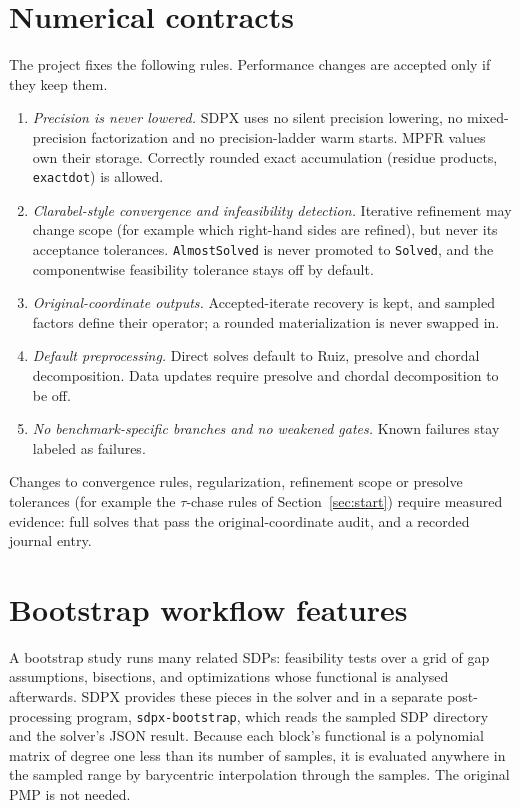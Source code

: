 \documentclass[11pt]{article}
\newcommand{\code}[1]{\texttt{#1}}
\begin{document}
\section{Numerical contracts}
\label{sec:contracts}

The project fixes the following rules. Performance changes are accepted only
if they keep them.
\begin{enumerate}
  \item \emph{Precision is never lowered.} SDPX uses no silent precision
    lowering, no mixed-precision factorization and no precision-ladder warm
    starts. MPFR values own their storage. Correctly rounded exact
    accumulation (residue products, \code{exactdot}) is allowed.
  \item \emph{Clarabel-style convergence and infeasibility detection.}
    Iterative refinement may change scope (for example which right-hand
    sides are refined), but never its acceptance tolerances.
    \code{AlmostSolved} is never promoted to \code{Solved}, and
    the componentwise feasibility tolerance stays off by default.
  \item \emph{Original-coordinate outputs.} Accepted-iterate recovery is kept,
    and sampled factors define their operator; a rounded materialization is
    never swapped in.
  \item \emph{Default preprocessing.} Direct solves default to Ruiz,
    presolve and chordal decomposition. Data updates require presolve and
    chordal decomposition to be off.
  \item \emph{No benchmark-specific branches and no weakened gates.} Known
    failures stay labeled as failures.
\end{enumerate}
Changes to convergence rules, regularization, refinement scope or presolve
tolerances (for example the $\tau$-chase rules of Section~\ref{sec:start})
require measured evidence: full solves that pass the original-coordinate
audit, and a recorded journal entry.

\section{Bootstrap workflow features}\label{sec:workflow}

A bootstrap study runs many related SDPs: feasibility tests over a grid of
gap assumptions, bisections, and optimizations whose functional is
analysed afterwards. SDPX provides these pieces in the solver and in a
separate post-processing program, \code{sdpx-bootstrap}, which reads the
sampled SDP directory and the solver's JSON result. Because each block's
functional is a polynomial matrix of degree one less than its number of
samples, it is evaluated anywhere in the sampled range by barycentric
interpolation through the samples. The original PMP is not needed.
\end{document}
